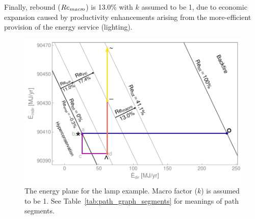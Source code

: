 \documentclass[12pt]{article}\usepackage[]{graphicx}\usepackage[]{xcolor}
\makeatletter
\def\maxwidth{ %
  \ifdim\Gin@nat@width>\linewidth
    \linewidth
  \else
    \Gin@nat@width
  \fi
}
\newenvironment{knitrout}{}{} %
\makeatother
\begin{document}
Finally, \macroeffect{} rebound
($Re_{macr\!o}$) is 13.0\%
with $k$ assumed to be 1,
due to economic expansion caused by 
productivity enhancements arising from the more-efficient provision of the 
energy service (lighting).


\begin{knitrout}
\color{fgcolor}\begin{figure}

{\centering \includegraphics[width=\maxwidth]{figure/LampEnergyGraph-1} 

}

\caption{The energy plane for the lamp example. Macro factor ($k$) is assumed to be 1. See Table~\ref{tab:path_graph_segments} for meanings of path segments.}\label{fig:LampEnergyGraph}
\end{figure}

\end{knitrout}
\end{document}
